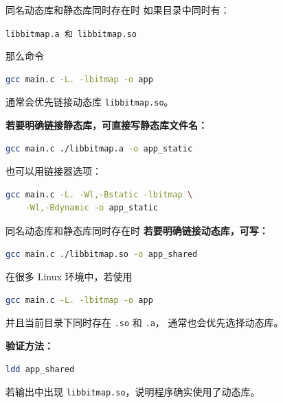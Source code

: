 \documentclass[aspectratio=169,11pt]{beamer}
\begin{document}
\begin{frame}[fragile]{同名动态库和静态库同时存在时}
如果目录中同时有：
\begin{center}
\texttt{libbitmap.a \quad 和 \quad libbitmap.so}
\end{center}

那么命令
\begin{lstlisting}[language=bash]
gcc main.c -L. -lbitmap -o app
\end{lstlisting}
通常会\alert{优先链接动态库 \texttt{libbitmap.so}}。

\vspace{0.5em}
\textbf{若要明确链接静态库，可直接写静态库文件名：}
\begin{lstlisting}[language=bash]
gcc main.c ./libbitmap.a -o app_static
\end{lstlisting}

\vspace{0.4em}
也可以用链接器选项：
\begin{lstlisting}[language=bash]
gcc main.c -L. -Wl,-Bstatic -lbitmap \
    -Wl,-Bdynamic -o app_static
\end{lstlisting}
\end{frame}

\begin{frame}[fragile]{同名动态库和静态库同时存在时}
\textbf{若要明确链接动态库，可写：}
\begin{lstlisting}[language=bash]
gcc main.c ./libbitmap.so -o app_shared
\end{lstlisting}

\vspace{0.5em}
在很多 Linux 环境中，若使用
\begin{lstlisting}[language=bash]
gcc main.c -L. -lbitmap -o app
\end{lstlisting}
并且当前目录下同时存在 \texttt{.so} 和 \texttt{.a}，
通常也会优先选择动态库。

\vspace{0.5em}
\textbf{验证方法：}
\begin{lstlisting}[language=bash]
ldd app_shared
\end{lstlisting}

若输出中出现 \texttt{libbitmap.so}，说明程序确实使用了动态库。
\end{frame}
\end{document}
